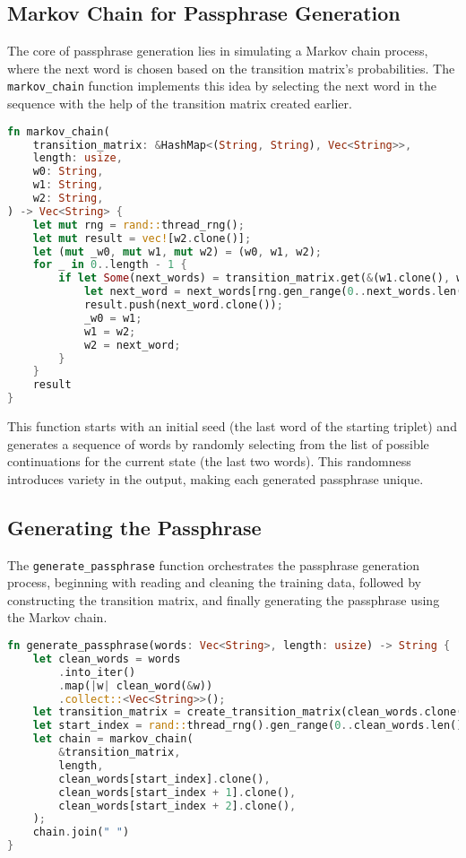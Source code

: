 \documentclass[a4paper,12pt]{article}
\begin{document}
\subsection{Markov Chain for Passphrase Generation}
The core of passphrase generation lies in simulating a Markov chain process, where the next word is chosen based on the transition matrix's probabilities. The \texttt{markov\_chain} function implements this idea by selecting the next word in the sequence with the help of the transition matrix created earlier.

\begin{lstlisting}[language=Rust, caption={Markov Chain Function}]
fn markov_chain(
    transition_matrix: &HashMap<(String, String), Vec<String>>,
    length: usize,
    w0: String,
    w1: String,
    w2: String,
) -> Vec<String> {
    let mut rng = rand::thread_rng();
    let mut result = vec![w2.clone()];
    let (mut _w0, mut w1, mut w2) = (w0, w1, w2);
    for _ in 0..length - 1 {
        if let Some(next_words) = transition_matrix.get(&(w1.clone(), w2.clone())) {
            let next_word = next_words[rng.gen_range(0..next_words.len())].clone();
            result.push(next_word.clone());
            _w0 = w1;
            w1 = w2;
            w2 = next_word;
        }
    }
    result
}
\end{lstlisting}

This function starts with an initial seed (the last word of the starting triplet) and generates a sequence of words by randomly selecting from the list of possible continuations for the current state (the last two words). This randomness introduces variety in the output, making each generated passphrase unique.

\subsection{Generating the Passphrase}
The \texttt{generate\_passphrase} function orchestrates the passphrase generation process, beginning with reading and cleaning the training data, followed by constructing the transition matrix, and finally generating the passphrase using the Markov chain.

\begin{lstlisting}[language=Rust, caption={Generating the Passphrase}]
fn generate_passphrase(words: Vec<String>, length: usize) -> String {
    let clean_words = words
        .into_iter()
        .map(|w| clean_word(&w))
        .collect::<Vec<String>>();
    let transition_matrix = create_transition_matrix(clean_words.clone());
    let start_index = rand::thread_rng().gen_range(0..clean_words.len() - 3);
    let chain = markov_chain(
        &transition_matrix,
        length,
        clean_words[start_index].clone(),
        clean_words[start_index + 1].clone(),
        clean_words[start_index + 2].clone(),
    );
    chain.join(" ")
}
\end{lstlisting}
\end{document}
